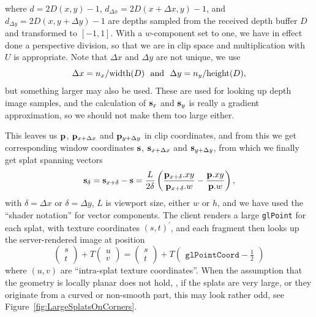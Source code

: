where $d = 2D(x, y) - 1$, $d_{\Delta x} =
2D(x+\Delta x, y) - 1$, and $d_{\Delta y} = 2D(x,
y+\Delta y) - 1$ are depths sampled from the received depth buffer
$D$ and transformed to $[-1, 1]$. With a
$w$-component set to one, we have in effect done a perspective division, so that
we are in clip space and multiplication with $U$ is appropriate.
%
Note that $\Delta x$ and $\Delta y$ are not unique, we use
\[
  \Delta x = n_x / \text{width}(D) \text{\,\,\,\,and\,\,\,\,}
  \Delta y = n_y / \text{height}(D),
\]
but something larger may also be used. These are used for looking up depth image
samples, and the calculation of $\mathbf{s}_x$ and $\mathbf{s}_y$ is really a gradient
approximation, so we should not make them too large either.

This leaves us $\mathbf{p}$, $\mathbf{p}_{x+\Delta x}$ and $\mathbf{p}_{y+\Delta y}$ in clip
coordinates, and from this we get
corresponding window coordinates $\mathbf{s}$, $\mathbf{s}_{x+\Delta x}$ and $\mathbf{s}_{y+\Delta
y}$, from which we finally get splat spanning vectors
\[
  \mathbf{s}_{\delta} =
  \mathbf{s}_{x+\delta} - \mathbf{s} =
    \frac{L}{2\delta} \left(
        \frac{\mathbf{p}_{x+\delta}.xy}{\mathbf{p}_{x+\delta}.w} -
        \frac{\mathbf{p}.xy}{\mathbf{p}.w}
    \right),
\]
with $\delta=\Delta x$ or $\delta=\Delta y$, $L$ is viewport size, either $w$ or
$h$, and we have used the ``shader notation'' for vector components.  The client
renders a large \texttt{glPoint} for each splat, with texture coordinates $(s,
t)^\prime$, and each fragment then looks up the server-rendered image at
position
\[
  \begin{pmatrix}
    s \\ t
  \end{pmatrix} +
  T 
  \begin{pmatrix}
    u \\ v
  \end{pmatrix}
  =
  \begin{pmatrix}
    s \\ t
  \end{pmatrix} +
  T 
  \begin{pmatrix}
    \texttt{glPointCoord}-\frac{1}{2}
  \end{pmatrix}
\]
where $(u, v)$ are ``intra-splat texture coordinates''.  When the assumption
that the geometry is locally planar does not hold, \eg, if the splats are very
large, or they originate from a curved or non-smooth part, this may look rather
odd, see Figure~\ref{fig:LargeSplatsOnCorners}.

